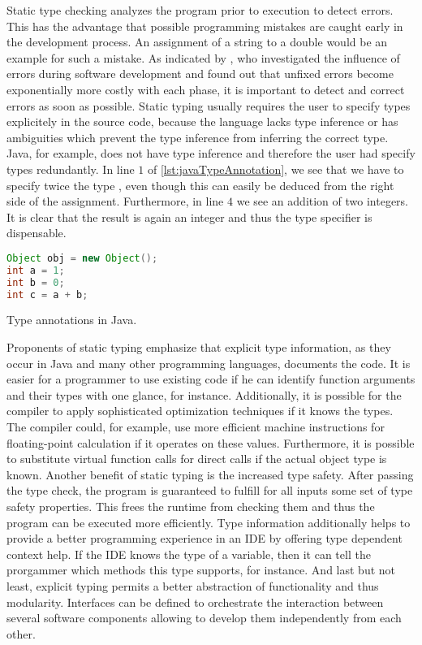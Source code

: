Static type checking analyzes the program prior to execution to detect errors.
This has the advantage that possible programming mistakes are caught early in the development process.
An assignment of a string to a double would be an example for such a mistake.
As indicated by \cite{westland:jss2002a}, who investigated the influence of errors during software development and found out that unfixed errors become exponentially more costly with each phase, it is important to detect and correct errors as soon as possible.
Static typing usually requires the user to specify types explicitely in the source code, because the language lacks type inference or has ambiguities which prevent the type inference from inferring the correct type.
Java, for example, does not have type inference and therefore the user had specify types redundantly.
In line $1$ of \cref{lst:javaTypeAnnotation}, we see that we have to specify twice the type , even though this can easily be deduced from the right side of the assignment.
Furthermore, in line $4$ we see an addition of two integers.
It is clear that the result is again an integer and thus the  type specifier is dispensable.
\begin{listing}[!h]
	\begin{CenteredBox}
		\begin{lstlisting}[language=Java]
Object obj = new Object();
int a = 1;
int b = 0;
int c = a + b;			
		\end{lstlisting}
	\end{CenteredBox}
	\caption{Type annotations in Java.}
	\label{lst:javaTypeAnnotation}
\end{listing}

Proponents of static typing emphasize that explicit type information, as they occur in Java and many other programming languages, documents the code.
It is easier for a programmer to use existing code if he can identify function arguments and their types with one glance, for instance. 
Additionally, it is possible for the compiler to apply sophisticated optimization techniques if it knows the types.
The compiler could, for example, use more efficient machine instructions for floating-point calculation if it operates on these values.
Furthermore, it is possible to substitute virtual function calls for direct calls if the actual object type is known.
Another benefit of static typing is the increased type safety.
After passing the type check, the program is guaranteed to fulfill for all inputs some set of type safety properties.
This frees the runtime from checking them and thus the program can be executed more efficiently.
Type information additionally helps to provide a better programming experience in an IDE by offering type dependent context help.
If the IDE knows the type of a variable, then it can tell the prorgammer which methods this type supports, for instance.
And last but not least, explicit typing permits a better abstraction of functionality and thus modularity.
Interfaces can be defined to orchestrate the interaction between several software components allowing to develop them independently from each other.


